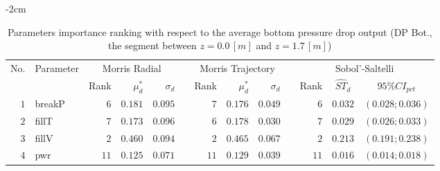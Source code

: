 \begin{table*}[!htbp]\centering
{}
\begin{adjustwidth*}{}{-2cm}
\caption{Parameters importance ranking with respect to the average bottom pressure drop output (DP Bot., the segment between $z = 0.0 \, [m]$ and $z = 1.7 \, [m]$)}
\label{tab:app_screening_dpbot_average}
\begin{tabular}{@{}rlrrrrrrrrrcc@{}}\toprule
\multirow{2}{*}{\footnotesize{No.}} & \multirow{2}{*}{\footnotesize{Parameter}} & \multicolumn{3}{c}{\footnotesize{Morris Radial}} & \phantom{a} & \multicolumn{3}{c}{\footnotesize{Morris Trajectory}}  &\phantom{a}& \multicolumn{3}{c}{\footnotesize{Sobol'-Saltelli}}                               \\             
                                                                                  \cmidrule{3-5}                                                   \cmidrule{7-9}                                                      \cmidrule{11-13}
                                    &                                           & \footnotesize{Rank}   & $\mu^*_d$ & $\sigma_d$   &             & \footnotesize{Rank} & $\mu^*_d$ & $\sigma_d$          &           & \footnotesize{Rank} & \footnotesize{$\hat{ST}_d$} & \footnotesize{$95\%CI_{pct}$}\\ \midrule
\footnotesize{$1 $} & \footnotesize{breakP   } & \footnotesize{$6 $} & \footnotesize{$0.181$} & \footnotesize{$0.095$} && \footnotesize{$7 $} & \footnotesize{$0.176$} & \footnotesize{$0.049$} && \footnotesize{$6 $} & \footnotesize{$0.032$} & \footnotesize{$(0.028;0.036)$} \\
\footnotesize{$2 $} & \footnotesize{fillT    } & \footnotesize{$7 $} & \footnotesize{$0.173$} & \footnotesize{$0.096$} && \footnotesize{$6 $} & \footnotesize{$0.178$} & \footnotesize{$0.030$} && \footnotesize{$7 $} & \footnotesize{$0.029$} & \footnotesize{$(0.026;0.033)$} \\
\footnotesize{$3 $} & \footnotesize{fillV    } & \footnotesize{$2 $} & \footnotesize{$0.460$} & \footnotesize{$0.094$} && \footnotesize{$2 $} & \footnotesize{$0.465$} & \footnotesize{$0.067$} && \footnotesize{$2 $} & \footnotesize{$0.213$} & \footnotesize{$(0.191;0.238)$} \\
\footnotesize{$4 $} & \footnotesize{pwr      } & \footnotesize{$11$} & \footnotesize{$0.125$} & \footnotesize{$0.071$} && \footnotesize{$11$} & \footnotesize{$0.129$} & \footnotesize{$0.039$} && \footnotesize{$11$} & \footnotesize{$0.016$} & \footnotesize{$(0.014;0.018)$} \\

\end{tabular}
\end{adjustwidth*}
\end{table*}
